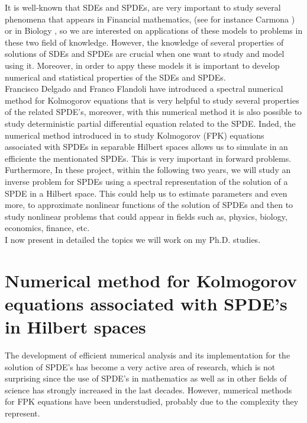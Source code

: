 \documentclass{article}
\numberwithin{equation}{section}
\begin{document}
It is well-known that SDEs and SPDEs, are very important to study several phenomena that appears in Financial mathematics, (see for instance 
Carmona \cite{ca}) or in Biology \cite{le-pe-po}, so we are interested on applications of these models to problems in these two field of knowledge. However, the knowledge of several properties of solutions of SDEs and SPDEs are crucial when one want to study and model using it. Moreover, in order to appy these models it is important to develop numerical and statistical properties of the SDEs and SPDEs.\\



 
Francisco Delgado and Franco Flandoli have introduced a spectral numerical method for Kolmogorov equations that is very helpful to study 
several properties of the related SPDE's, moreover, with this numerical method it is also possible to study deterministic partial differential equation 
related to the SPDE. Inded, 
the numerical method introduced in \cite{de-fl} to study Kolmogorov (FPK) equations associated with SPDEs in separable Hilbert spaces allows us to simulate in an efficiente the mentionated SPDEs. This is very important in forward problems. Furthermore, In these project, within the following two years, we will study an inverse problem for SPDEs using a spectral representation of the solution of a SPDE in a Hilbert space. This could help us to estimate parameters and even more, to approximate nonlinear functions of the solution of SPDEs and then to study nonlinear problems that could appear in fields such as, physics, biology, economics, finance, etc. \\



I now present in detailed the topics we will work on my Ph.D. studies.

 \section{Numerical method for Kolmogorov equations associated with SPDE's in Hilbert spaces} 
 The development of efficient numerical analysis and its
implementation for the solution of SPDE's has become a very active area of research, which is not surprising since the use of SPDE's in mathematics as well as in other fields of science has strongly increased in the last decades. However, numerical methods for FPK equations have been understudied, probably due to the complexity they represent.\\
 
\end{document}
